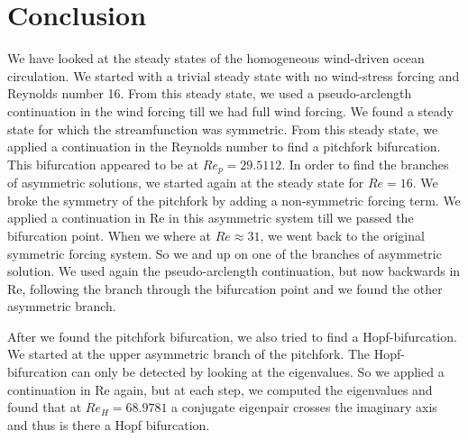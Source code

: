 \section{Conclusion}
We have looked at the steady states of the homogeneous wind-driven ocean circulation. We started with a trivial steady state with no wind-stress forcing and Reynolds number 16. From this steady state, we used a pseudo-arclength continuation in the wind forcing till we had full wind forcing. We found a steady state for which the streamfunction was symmetric. From this steady state, we applied a continuation in the Reynolds number to find a pitchfork bifurcation. This bifurcation appeared to be at $Re_p=29.5112$. In order to find the branches of asymmetric solutions, we started again at the steady state for $Re=16$. We broke the symmetry of the pitchfork by adding a non-symmetric forcing term. We applied a continuation in Re in this asymmetric system till we passed the bifurcation point. When we where at $Re\approx 31$, we went back to the original symmetric forcing system. So we and up on one of the branches of asymmetric solution. We used again the pseudo-arclength continuation, but now backwards in Re, following the branch through the bifurcation point and we found the other asymmetric branch.

After we found the pitchfork bifurcation, we also tried to find a Hopf-bifurcation. We started at the upper asymmetric branch of the pitchfork. The Hopf-bifurcation can only be detected by looking at the eigenvalues. So we applied a continuation in Re again, but at each step, we computed the eigenvalues and found that at $Re_H=68.9781$ a conjugate eigenpair crosses the imaginary axis and thus is there a Hopf bifurcation.
